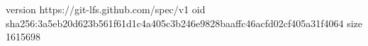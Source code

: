 version https://git-lfs.github.com/spec/v1
oid sha256:3a5eb20d623b561f61d1c4a405c3b246e9828baaffc46acfd02cf405a31f4064
size 1615698
